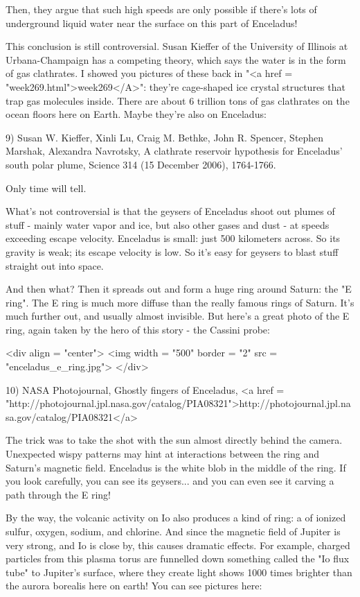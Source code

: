 Then, they argue that such high speeds are only possible if there's
lots of underground liquid water near the surface on this part of Enceladus!

This conclusion is still controversial.  Susan Kieffer of the University
of Illinois at Urbana-Champaign has a competing theory, which says the
water is in the form of gas clathrates.  I showed you pictures of these
back in "<a href = "week269.html">week269</A>": they're cage-shaped ice crystal structures that trap
gas molecules inside.  There are about 6 trillion tons of gas clathrates
on the ocean floors here on Earth.  Maybe they're also on Enceladus:

9) Susan W. Kieffer, Xinli Lu, Craig M. Bethke, John R. Spencer, Stephen Marshak, Alexandra Navrotsky, A clathrate reservoir hypothesis for 
Enceladus' south polar plume, Science 314 (15 December 2006), 1764-1766.

Only time will tell.

What's not controversial is that the geysers of Enceladus shoot out
plumes of stuff - mainly water vapor and ice, but also other gases and
dust - at speeds exceeding escape velocity.  Enceladus is small: just
500 kilometers across.  So its gravity is weak; its escape velocity is
low.  So it's easy for geysers to blast stuff straight out into space.

And then what?  Then it spreads out and form a huge ring around
Saturn: the "E ring".  The E ring is much more diffuse than
the really famous rings of Saturn.  It's much further out, and usually
almost invisible.  But here's a great photo of the E ring, again taken by
the hero of this story - the Cassini probe:

<div align = "center">
<img width = "500" border = "2" src = "enceladus_e_ring.jpg">
</div>

10) NASA Photojournal, Ghostly fingers of Enceladus,
<a href = "http://photojournal.jpl.nasa.gov/catalog/PIA08321">http://photojournal.jpl.nasa.gov/catalog/PIA08321</a>

The trick was to take the shot with the sun almost directly behind the
camera.  Unexpected wispy patterns may hint at interactions between
the ring and Saturn's magnetic field.  Enceladus is the white blob in
the middle of the ring.  If you look carefully, you can see its
geysers... and you can even see it carving a path through the E ring!

By the way, the volcanic activity on Io also produces a kind of ring:
a of ionized sulfur, oxygen, sodium, and chlorine.  And since the
magnetic field of Jupiter is very strong, and Io is close by, this
causes dramatic effects.  For example, charged particles from this
plasma torus are funnelled down something called the "Io flux
tube" to Jupiter's surface, where they create light shows 1000
times brighter than the aurora borealis here on earth!  You can see
pictures here:

